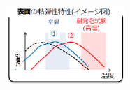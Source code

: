 \documentclass[12pt, dvipdfmx]{beamer}
\begin{document}
\begin{frame}
\begin{columns}
\begin{column}{6.0cm}
		\vspace{-1.8\baselineskip}
		\begin{figure}[htbp]
			\begin{center}
				\includegraphics[width=45mm]{nakamura-3.png}
			\end{center}
		\end{figure}

	\end{column}
\end{columns}

\end{frame}
\end{document}
